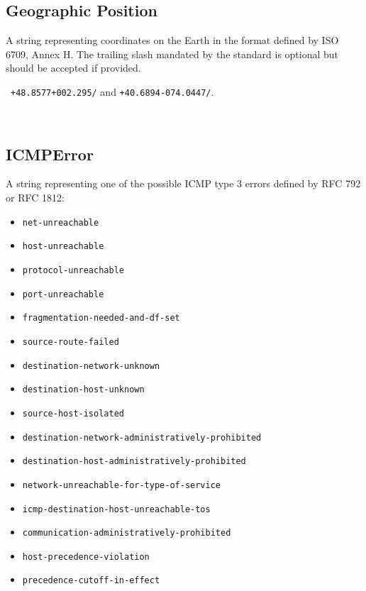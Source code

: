 \documentclass[10pt]{article}
\begin{document}
\subsection{Geographic Position}
A string representing coordinates on the Earth in the format defined
by ISO 6709, Annex H.  The trailing slash mandated by the standard is
optional but should be accepted if provided.

\example\ {\tt +48.8577+002.295/} and {\tt +40.6894-074.0447/}.

\\


\subsection{ICMPError}
A string representing one of the possible ICMP type 3 errors defined by RFC 792 or RFC 1812:

\begin{itemize}
\item {\tt net-unreachable}
\item {\tt host-unreachable}
\item {\tt protocol-unreachable}
\item {\tt port-unreachable}
\item {\tt fragmentation-needed-and-df-set}
\item {\tt source-route-failed}
\item {\tt destination-network-unknown}
\item {\tt destination-host-unknown}
\item {\tt source-host-isolated}
\item {\tt destination-network-administratively-prohibited}
\item {\tt destination-host-administratively-prohibited}
\item {\tt network-unreachable-for-type-of-service}
\item {\tt icmp-destination-host-unreachable-tos}
\item {\tt communication-administratively-prohibited}
\item {\tt host-precedence-violation}
\item {\tt precedence-cutoff-in-effect}
\end{itemize}

\\
\end{document}
